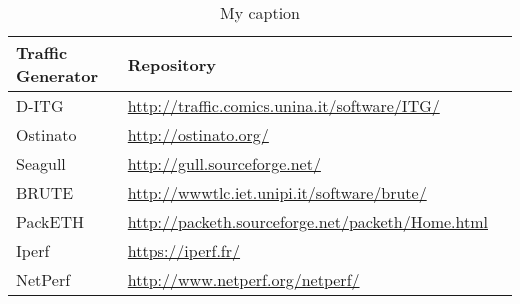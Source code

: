 \sloppy
\begin{table}[ht!]
\centering
\sloppy
\caption{My caption}
\label{my-label}
\begin{tabularx}{\textwidth}{@{}ll@{} p{10.0cm}}
\toprule
\sloppy
Traffic Generator       & Repository                                                                                                                                                                                                                \\ \midrule
D-ITG                   & \href{http://traffic.comics.unina.it/software/ITG/}{http://traffic.comics.unina.it/software/ITG/}                                                                                                                         \\
Ostinato                & \href{http://ostinato.org/}{http://ostinato.org/}                                                                                                                                                                         \\
Seagull                 & \href{http://gull.sourceforge.net/}{http://gull.sourceforge.net/}                                                                                                                                                         \\
BRUTE                   & \href{http://wwwtlc.iet.unipi.it/software/brute/ }{http://wwwtlc.iet.unipi.it/software/brute/ }                                                                                                                           \\
PackETH                 & \href{http://packeth.sourceforge.net/packeth/Home.html}{http://packeth.sourceforge.net/packeth/Home.html}                                                                                                                 \\
Iperf                   & \href{https://iperf.fr/}{https://iperf.fr/}                                                                                                                                                                               \\
NetPerf                 & \href{http://www.netperf.org/netperf/}{http://www.netperf.org/netperf/}                                                                                                                                                   \\

\end{tabularx}
\end{table}
